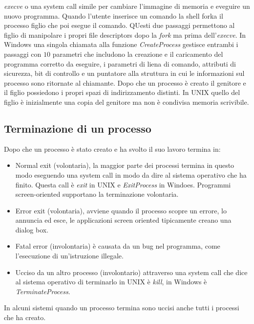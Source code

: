 \emph{execve} o una system call simile per cambiare l'immagine di memoria e eveguire un nuovo programma. Quando l'utente inserisce un comando la shell forka il processo figlio che poi
esegue il comando. QUesti due passaggi permettono al figlio di manipolare i propri file descriptors dopo la \emph{fork} ma prima dell'\emph{execve}. In Windows una singola chiamata alla
funzione \emph{CreateProcess} gestisce entrambi i passaggi con $10$ parametri che includono la creazione e il caricamento del programma corretto da eseguire, i parametri di liena di
comando, attributi di sicurezza, bit di controllo e un puntatore alla struttura in cui le informazioni sul processo sono ritornate al chiamante. Dopo che un processo \`e creato
il genitore e il figlio possiedono i propri spazi di indirizzamento distinti. In UNIX quello del figlio \`e inizialmente una copia del genitore ma non \`e condivisa memoria scrivibile.
\subsection{Terminazione di un processo}
Dopo che un processo \`e stato creato e ha svolto il suo lavoro termina in:
\begin{itemize}
	\item Normal exit (volontaria), la maggior parte dei processi termina in questo modo eseguendo una system call in modo da dire al sistema operativo che ha finito.
	      Questa call \`e \emph{exit} in UNIX e \emph{ExitProcess} in Windoes. Programmi screen-oriented supportano la terminazione volontaria.
	\item Error exit (volontaria), avviene quando il processo scopre un errore, lo annuncia ed esce, le applicazioni screen oriented tipicamente creano una dialog box.
	\item Fatal error (involontaria) \`e causata da un bug nel programma, come l'esecuzione di un'istruzione illegale.
	\item Ucciso da un altro processo (involontario) attraverso una system call che dice al sistema operativo di terminarlo in UNIX \`e \emph{kill}, in Windows \`e
	      \emph{TerminateProcess}.
\end{itemize}
In alcuni sistemi quando un processo termina sono uccisi anche tutti i processi che ha creato.
